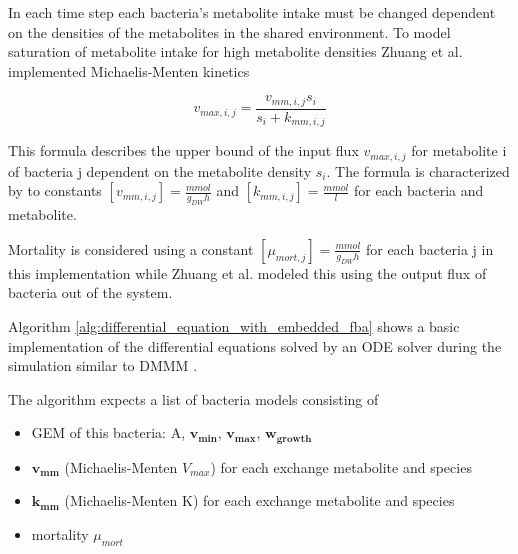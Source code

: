 \documentclass[a4paper,10pt]{article}
\begin{document}
In each time step each bacteria's metabolite intake must be changed dependent on the densities of the metabolites in the shared environment.
To model saturation of metabolite intake for high metabolite densities Zhuang et al. implemented Michaelis-Menten kinetics \cite{johnson2011original}

\begin{equation} \label{eq:michaelis-menten}
 v_{max,i,j} = \frac{v_{mm,i,j} s_i}{s_i + k_{mm,i,j}}
\end{equation}

This formula describes the upper bound of the input flux $v_{max,i,j}$ for metabolite i of bacteria j dependent on the metabolite density
$s_i$. The formula is characterized by to constants $\left[ v_{mm,i,j} \right] = \frac{mmol}{g_{DW} h}$ and $\left[ k_{mm,i,j} \right] = \frac{mmol}{l}$
for each bacteria and metabolite.

Mortality is considered using a constant $\left[ \mu_{mort,j} \right] = \frac{mmol}{g_{DW} h}$ for each bacteria j in this implementation while Zhuang et al. modeled this
using the output flux of bacteria out of the system.


Algorithm \ref{alg:differential_equation_with_embedded_fba} shows a basic implementation of the differential equations solved by an ODE
solver during the simulation similar to DMMM \cite{zhuang_genome-scale_2011}.

The algorithm expects a list of bacteria models consisting of
\begin{itemize}
 \item GEM of this bacteria: A, $\bm{v_{min}}$, $\bm{v_{max}}$, $\bm{w_{growth}}$
 \item $\bm{v_{mm}}$ (Michaelis-Menten $V_{max}$) for each exchange metabolite and species
 \item $\bm{k_{mm}}$ (Michaelis-Menten K) for each exchange metabolite and species
 \item mortality $\mu_{mort}$
\end{itemize}
\end{document}
